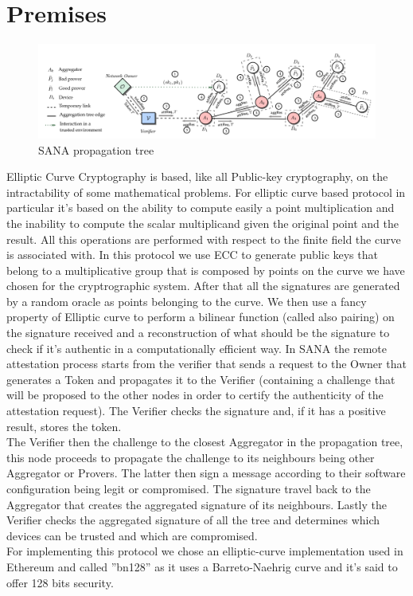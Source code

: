 \documentclass[10pt, a4paper, twocolumn]{article} %
\begin{document}
 
\section{Premises}

\begin{figure}
	\includegraphics[width=\linewidth]{images/SANA_general.png} %
	\caption{SANA propagation tree} %
	\label{bear} %
\end{figure}

Elliptic Curve Cryptography is based, like all Public-key cryptography, on the intractability of some mathematical problems.
For elliptic curve based protocol in particular it's based on the ability to compute easily a point multiplication and the inability to compute the scalar multiplicand given the original point and the result.
All this operations are performed with respect to the finite field the curve is associated with.
In this protocol we use ECC to generate public keys that belong to a multiplicative group that is composed by points on the curve we have chosen for the cryptrographic system.
After that all the signatures are generated by a random oracle as points belonging to the curve. We then use a fancy property of Elliptic curve to perform a bilinear function (called also pairing) on the signature received and a reconstruction of what should be the signature to check if it's authentic in a computationally efficient way.
In SANA the remote attestation process starts from the verifier that sends a request to the Owner that generates a Token and propagates it to the Verifier (containing a challenge that will be proposed to the other nodes in order to certify the authenticity of the attestation request). The Verifier checks the signature and, if it has a positive result, stores the token. \\The Verifier then
the challenge to the closest Aggregator in the propagation tree, this node proceeds to propagate the challenge to its neighbours being other Aggregator
or Provers. The latter then sign a message according to their software configuration being legit or compromised. The signature travel back to the Aggregator
that creates the aggregated signature of its neighbours. Lastly the Verifier checks the aggregated signature of all the tree and determines which devices
can be trusted and which are compromised.\\
For implementing this protocol we chose an elliptic-curve implementation used in Ethereum and called ''bn128'' as it uses a Barreto-Naehrig curve and it's said to offer 128 bits security.
\end{document}
